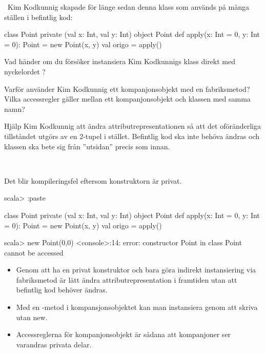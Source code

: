\QUESTEND






\clearpage

\AdvancedTasks %



\QUESTBEGIN

\Task \what~Kim Kodkunnig skapade för länge sedan denna klass som används på många ställen i befintlig kod:

\begin{Code}
class Point private (val x: Int, val y: Int)
object Point {
  def apply(x: Int = 0, y: Int = 0): Point = new Point(x, y)
  val origo = apply()
}
\end{Code}

\Subtask Vad händer om du försöker instansiera Kim Kodkunnigs klass direkt med nyckelordet ?

\Subtask Varför använder Kim Kodkunnig ett kompanjonsobjekt med en fabriksmetod? Vilka accessregler gäller mellan ett kompanjonsobjekt och klassen med samma namn?

\Subtask Hjälp Kim Kodkunnig att ändra attributrepresentationen så att det oföränderliga tillståndet utgörs av en 2-tupel  i stället. Befintlig kod ska inte behöva ändras och klassen  ska bete sig från ''utsidan'' precis som innan.

\SOLUTION

\TaskSolved \what~

\SubtaskSolved Det blir kompileringsfel eftersom konstruktorn är privat.
\begin{REPL}
scala> :paste

class Point private (val x: Int, val y: Int)
object Point {
  def apply(x: Int = 0, y: Int = 0): Point = new Point(x, y)
  val origo = apply()
}

scala> new Point(0,0)
<console>:14: error: constructor Point in class Point cannot be accessed
\end{REPL}

\SubtaskSolved
\begin{itemize}
  \item Genom att ha en privat konstruktor och bara göra indirekt instansiering via fabriksmetod är lätt ändra attributrepresentation i framtiden utan att befintlig kod behöver ändras.

  \item Med en -metod i kompansjonsobjektet kan man instansiera genom att skriva  utan new.

  \item Accessreglerna för kompanjonsobjekt är sådana att kompanjoner ser varandras privata delar.
\end{itemize}

